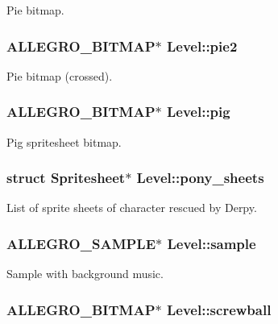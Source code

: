 \-Pie bitmap. \hypertarget{structLevel_a6b817f8a028cbb01ea9d7e1e6dbcdede}{
\subsubsection[{pie2}]{\setlength{\rightskip}{0pt plus 5cm}\-A\-L\-L\-E\-G\-R\-O\-\_\-\-B\-I\-T\-M\-A\-P$\ast$ {\bf \-Level\-::pie2}}}\label{structLevel_a6b817f8a028cbb01ea9d7e1e6dbcdede}
\-Pie bitmap (crossed). \hypertarget{structLevel_aacde4816ff59c4d9ab6f403758630b8f}{
\subsubsection[{pig}]{\setlength{\rightskip}{0pt plus 5cm}\-A\-L\-L\-E\-G\-R\-O\-\_\-\-B\-I\-T\-M\-A\-P$\ast$ {\bf \-Level\-::pig}}}\label{structLevel_aacde4816ff59c4d9ab6f403758630b8f}
\-Pig spritesheet bitmap. \hypertarget{structLevel_a591b830752cc796a306e96166f736e3b}{
\subsubsection[{pony\-\_\-sheets}]{\setlength{\rightskip}{0pt plus 5cm}struct {\bf \-Spritesheet}$\ast$ {\bf \-Level\-::pony\-\_\-sheets}}}\label{structLevel_a591b830752cc796a306e96166f736e3b}
\-List of sprite sheets of character rescued by \-Derpy. \hypertarget{structLevel_a234fa7b9ec35dd360e4e3c48a944fc7d}{
\subsubsection[{sample}]{\setlength{\rightskip}{0pt plus 5cm}\-A\-L\-L\-E\-G\-R\-O\-\_\-\-S\-A\-M\-P\-L\-E$\ast$ {\bf \-Level\-::sample}}}\label{structLevel_a234fa7b9ec35dd360e4e3c48a944fc7d}
\-Sample with background music. \hypertarget{structLevel_a40c90c0712efb86cd76d0dcae74f2cbd}{
\subsubsection[{screwball}]{\setlength{\rightskip}{0pt plus 5cm}\-A\-L\-L\-E\-G\-R\-O\-\_\-\-B\-I\-T\-M\-A\-P$\ast$ {\bf \-Level\-::screwball}}}\label{structLevel_a40c90c0712efb86cd76d0dcae74f2cbd}
